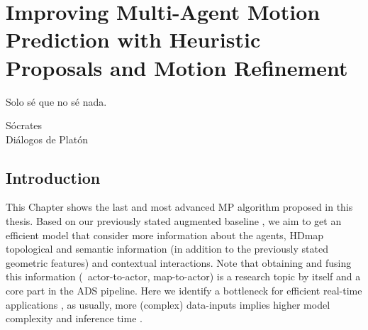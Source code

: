 % 
% 
% 
% 
% 
% 
% 

\chapter{Improving Multi-Agent Motion Prediction with Heuristic Proposals and Motion Refinement}
\label{cha:improving_multi_agent}

\begin{FraseCelebre}
	\begin{Frase}
		Solo sé que no sé nada.
	\end{Frase}
	\begin{Fuente}
		Sócrates \\
		Diálogos de Platón
	\end{Fuente}
\end{FraseCelebre}

\section{Introduction}
\label{sec:7_introduction}

This Chapter shows the last and most advanced \ac{MP} algorithm proposed in this thesis. Based on our previously stated augmented baseline \cite{gomez2023efficientgraphtransformer}, we aim to get an efficient model that consider more information about the agents, \ac{HDmap} topological and semantic information (in addition to the previously stated geometric features) and contextual interactions. Note that obtaining and fusing this information (\eg \ actor-to-actor, map-to-actor) is a research topic by itself \cite{varadarajan2022multipath++, zeng2021lanercnn, liang2020learning} and a core part in the \ac{ADS} pipeline. Here we identify a bottleneck for efficient real-time applications \cite{KATRAKAZAS2015416realtime, gomez2021smartmot}, as usually, more (complex) data-inputs implies higher model complexity and inference time \cite{gao2020vectornet}. 

